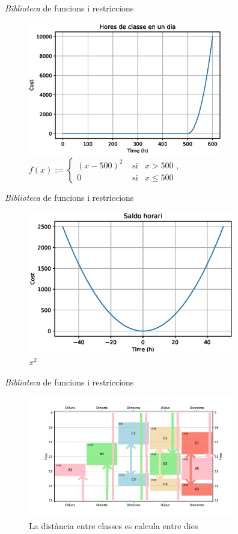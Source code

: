 \documentclass[twocolumn]{beamer}
\begin{document}
\begin{frame}{\textit{Biblioteca} de funcions i restriccions}
\begin{figure}
	\includegraphics[width=8.5cm]{hores_dia}
	\caption{
	$f(x):=\left\lbrace 
	\begin{matrix}
		(x-500)^2& \text{ si}& x>500\text{ ,} \\
		0& \text{ si}& x\leq 500& \end{matrix}
	\right.$
	}
\end{figure}
\end{frame}

\begin{frame}{\textit{Biblioteca} de funcions i restriccions}
\begin{figure}
	\includegraphics[width=9cm]{saldo}
	\caption{$x^2$}
\end{figure}
\end{frame}

\begin{frame}{\textit{Biblioteca} de funcions i restriccions}
\begin{figure}
	\includegraphics[width=9cm]{../plots/llibreria_funcs/horari}
	\caption{La distància entre classes es calcula entre dies}
\end{figure}
\end{frame}
\end{document}
